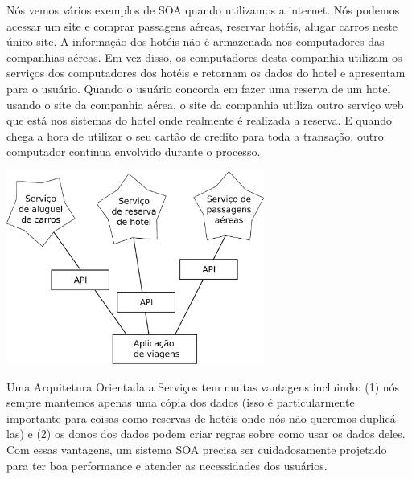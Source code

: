 Nós vemos vários exemplos de SOA quando utilizamos a internet. Nós podemos
acessar um site e comprar passagens aéreas, reservar hotéis, alugar carros
neste único site. A informação dos hotéis não é armazenada nos computadores
das companhias aéreas. Em vez disso, os computadores desta companhia utilizam
os serviços dos computadores dos hotéis e retornam os dados do hotel e
apresentam para o usuário. Quando o usuário concorda em fazer uma reserva de
um hotel usando o site da companhia aérea, o site da companhia utiliza outro 
serviço web que está nos sistemas do hotel onde realmente é realizada a reserva.
E quando chega a hora de utilizar o seu cartão de credito para toda a transação,
outro computador continua envolvido durante o processo.

\beforefig
\centerline{\includegraphics[height=2.50in]{figs2/soa.eps}}
\afterfig
Uma Arquitetura Orientada a Serviços tem muitas vantagens incluindo: (1)
nós sempre mantemos apenas uma cópia dos dados (isso é particularmente
importante para coisas como reservas de hotéis onde nós não queremos duplicá-las)
e (2) os donos dos dados podem criar regras sobre como usar os dados deles.
Com essas vantagens, um sistema SOA precisa ser cuidadosamente projetado
para ter boa performance e atender as necessidades dos usuários.

